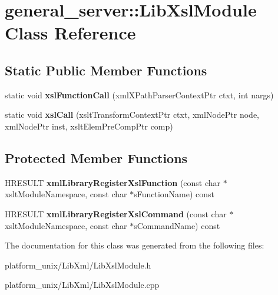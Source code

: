 \hypertarget{classgeneral__server_1_1LibXslModule}{\section{general\-\_\-server\-:\-:\-Lib\-Xsl\-Module \-Class \-Reference}
\label{classgeneral__server_1_1LibXslModule}
}
\subsection*{\-Static \-Public \-Member \-Functions}
\begin{DoxyCompactItemize}
\item 
\hypertarget{classgeneral__server_1_1LibXslModule_a82ac7eec4fad4876e47ee557a34ae4c8}{static void {\bfseries xsl\-Function\-Call} (xml\-X\-Path\-Parser\-Context\-Ptr ctxt, int nargs)}\label{classgeneral__server_1_1LibXslModule_a82ac7eec4fad4876e47ee557a34ae4c8}

\item 
\hypertarget{classgeneral__server_1_1LibXslModule_af4a3b1c8c1282a8b4ede3ac7c4c4584e}{static void {\bfseries xsl\-Call} (xslt\-Transform\-Context\-Ptr ctxt, xml\-Node\-Ptr node, xml\-Node\-Ptr inst, xslt\-Elem\-Pre\-Comp\-Ptr comp)}\label{classgeneral__server_1_1LibXslModule_af4a3b1c8c1282a8b4ede3ac7c4c4584e}

\end{DoxyCompactItemize}
\subsection*{\-Protected \-Member \-Functions}
\begin{DoxyCompactItemize}
\item 
\hypertarget{classgeneral__server_1_1LibXslModule_a44ce89ab076a2ca282bca6c33adc9942}{\-H\-R\-E\-S\-U\-L\-T {\bfseries xml\-Library\-Register\-Xsl\-Function} (const char $\ast$xslt\-Module\-Namespace, const char $\ast$s\-Function\-Name) const }\label{classgeneral__server_1_1LibXslModule_a44ce89ab076a2ca282bca6c33adc9942}

\item 
\hypertarget{classgeneral__server_1_1LibXslModule_af633363c576290c316e8ba3d74e3e87a}{\-H\-R\-E\-S\-U\-L\-T {\bfseries xml\-Library\-Register\-Xsl\-Command} (const char $\ast$xslt\-Module\-Namespace, const char $\ast$s\-Command\-Name) const }\label{classgeneral__server_1_1LibXslModule_af633363c576290c316e8ba3d74e3e87a}

\end{DoxyCompactItemize}


\-The documentation for this class was generated from the following files\-:\begin{DoxyCompactItemize}
\item 
platform\-\_\-unix/\-Lib\-Xml/\-Lib\-Xsl\-Module.\-h\item 
platform\-\_\-unix/\-Lib\-Xml/\-Lib\-Xsl\-Module.\-cpp\end{DoxyCompactItemize}

